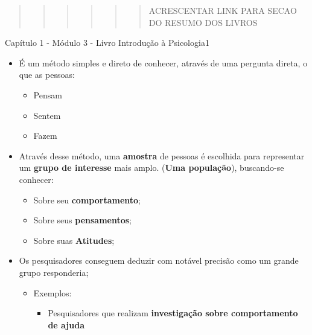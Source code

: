 \documentclass[
]{book}
\providecommand{\tightlist}{%
  \setlength{\itemsep}{0pt}\setlength{\parskip}{0pt}}
\begin{document}
\begin{quote}
\begin{quote}
\begin{quote}
\begin{quote}
\begin{quote}
\begin{quote}
ACRESCENTAR LINK PARA SECAO DO RESUMO DOS LIVROS
\end{quote}
\end{quote}
\end{quote}
\end{quote}
\end{quote}
\end{quote}

Capítulo 1 - Módulo 3 - Livro Introdução à
Psicologia1

\begin{itemize}
\tightlist
\item
  É um método simples e direto de conhecer, através de uma pergunta
  direta, o que as pessoas:

  \begin{itemize}
  \tightlist
  \item
    Pensam
  \item
    Sentem
  \item
    Fazem
  \end{itemize}
\item
  Através desse método, uma \textbf{amostra} de pessoas é escolhida para
  representar um \textbf{grupo de interesse} mais amplo. (\textbf{Uma
  população}), buscando-se conhecer:

  \begin{itemize}
  \tightlist
  \item
    Sobre seu \textbf{comportamento};
  \item
    Sobre seus \textbf{pensamentos};
  \item
    Sobre suas \textbf{Atitudes};
  \end{itemize}
\item
  Os pesquisadores conseguem deduzir com notável
  precisão como um grande grupo responderia;

  \begin{itemize}
  \tightlist
  \item
    Exemplos:

    \begin{itemize}
    \tightlist
    \item
      Pesquisadores que realizam \textbf{investigação sobre
      comportamento de ajuda}


\end{itemize}
\end{itemize}
\end{itemize}
\end{document}
